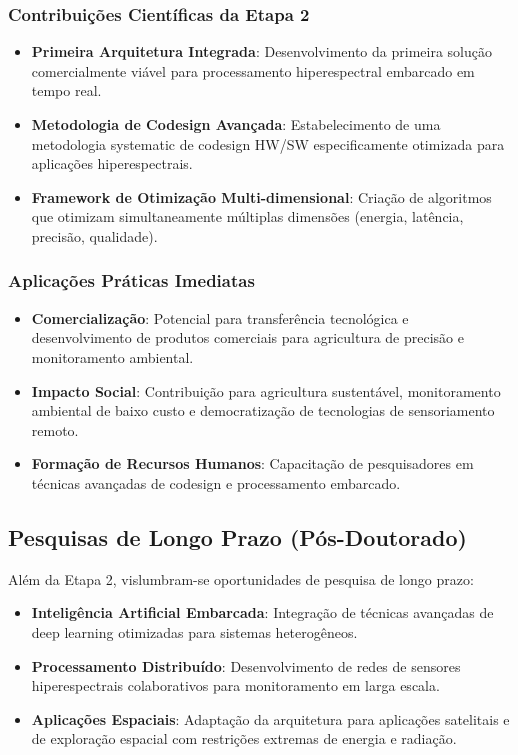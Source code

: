 \subsubsection{Contribuições Científicas da Etapa 2}

\begin{itemize}
\item \textbf{Primeira Arquitetura Integrada}: Desenvolvimento da primeira solução comercialmente viável para processamento hiperespectral embarcado em tempo real.

\item \textbf{Metodologia de Codesign Avançada}: Estabelecimento de uma metodologia systematic de codesign HW/SW especificamente otimizada para aplicações hiperespectrais.

\item \textbf{Framework de Otimização Multi-dimensional}: Criação de algoritmos que otimizam simultaneamente múltiplas dimensões (energia, latência, precisão, qualidade).
\end{itemize}

\subsubsection{Aplicações Práticas Imediatas}

\begin{itemize}
\item \textbf{Comercialização}: Potencial para transferência tecnológica e desenvolvimento de produtos comerciais para agricultura de precisão e monitoramento ambiental.

\item \textbf{Impacto Social}: Contribuição para agricultura sustentável, monitoramento ambiental de baixo custo e democratização de tecnologias de sensoriamento remoto.

\item \textbf{Formação de Recursos Humanos}: Capacitação de pesquisadores em técnicas avançadas de codesign e processamento embarcado.
\end{itemize}

\subsection{Pesquisas de Longo Prazo (Pós-Doutorado)}

Além da Etapa 2, vislumbram-se oportunidades de pesquisa de longo prazo:

\begin{itemize}
\item \textbf{Inteligência Artificial Embarcada}: Integração de técnicas avançadas de deep learning otimizadas para sistemas heterogêneos.

\item \textbf{Processamento Distribuído}: Desenvolvimento de redes de sensores hiperespectrais colaborativos para monitoramento em larga escala.

\item \textbf{Aplicações Espaciais}: Adaptação da arquitetura para aplicações satelitais e de exploração espacial com restrições extremas de energia e radiação.
\end{itemize}

